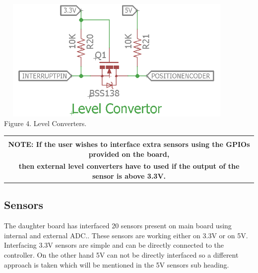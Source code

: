 \documentclass[a4paper,10pt,oneside]{article}
\begin{document}
{	\hspace{3.5cm}
	\begin{center}
	\includegraphics[width=12cm, height=6cm]{Images/Level_Converter}\\
	Figure 4. Level Converters.
	\begin{tabular}{|c|}
		\hline
		\\
		\textbf{NOTE: If the user wishes to interface extra sensors using the GPIOs provided on the board,} \\ \textbf{then external level converters have to used if the output of the sensor is above 3.3V.}
		\\
		\hline
	\end{tabular}
\end{center}
	\subsection{\textbf{Sensors}}{The daughter board has interfaced 20  sensors present on main board using internal and external  ADC.. These sensors are working either on 3.3V or on 5V. Interfacing 3.3V sensors are simple and can be directly connected to the controller. On the other hand 5V can not be directly interfaced so a different approach is taken which will be mentioned in the 5V sensors sub heading.}
}
\end{document}
